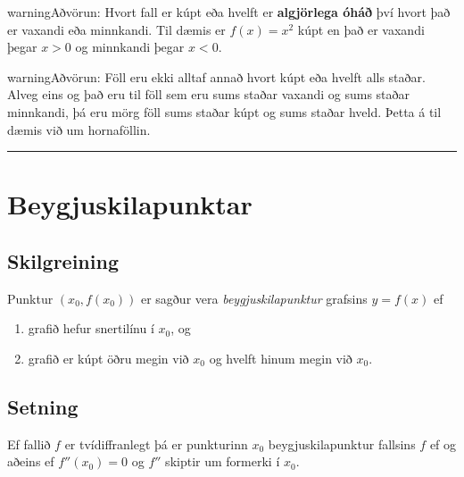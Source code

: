 \documentclass[b5paper,11pt,icelandic]{sphinxmanual}
\begin{document}
\begin{notice}{warning}{Aðvörun:}
Hvort fall er kúpt eða hvelft er \textbf{algjörlega óháð} því hvort það er
vaxandi eða minnkandi. Til dæmis er \(f(x) = x^2\) kúpt en það er
vaxandi þegar \(x>0\) og minnkandi þegar \(x<0\).
\end{notice}

\begin{notice}{warning}{Aðvörun:}
Föll eru ekki alltaf annað hvort kúpt eða hvelft alls staðar. Alveg
eins og það eru til föll sem eru sums staðar vaxandi og sums staðar
minnkandi, þá eru mörg föll sums staðar kúpt og sums staðar hveld.
Þetta á til dæmis við um hornaföllin.
\end{notice}


\bigskip\hrule{}\bigskip



\section{Beygjuskilapunktar}
\label{kafli05:beygjuskilapunktar}

\subsection{Skilgreining}
\label{kafli05:index-2}\label{kafli05:skilgreining}
Punktur \((x_0, f(x_0))\) er sagður vera \textit{beygjuskilapunktur}
grafsins \(y=f(x)\) ef
\begin{enumerate}
\item {} 
grafið hefur snertilínu í \(x_0\), og

\item {} 
grafið er kúpt öðru megin við \(x_0\) og hvelft hinum megin við
\(x_0\).

\end{enumerate}


\subsection{Setning}
\label{kafli05:id4}
Ef fallið \(f\) er tvídiffranlegt þá er punkturinn \(x_0\)
beygjuskilapunktur fallsins \(f\) ef og aðeins ef
\(f''(x_0) =0\) og \(f''\) skiptir um formerki í \(x_0\).


\end{document}
